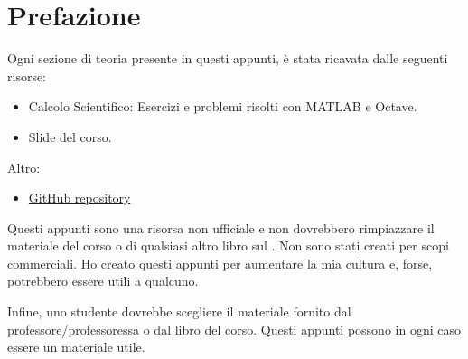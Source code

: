 \section*{Prefazione}

Ogni sezione di teoria presente in questi appunti, è stata ricavata dalle seguenti risorse:
\begin{itemize}
    \item Calcolo Scientifico: Esercizi e problemi risolti con MATLAB e Octave.\cite{quarteroni2017calcolo}
    \item Slide del corso.\cite{slides}
\end{itemize}
Altro:
\begin{itemize}
    \item[\faIcon{github}] \href{https://github.com/PoliMI-HPC-E-notes-projects-AndreVale69/HPC-E-PoliMI-university-notes}{GitHub repository}
\end{itemize}

Questi appunti sono una risorsa non ufficiale e non dovrebbero rimpiazzare il materiale del corso o di qualsiasi altro libro sul . Non sono stati creati per scopi commerciali. Ho creato questi appunti per aumentare la mia cultura e, forse, potrebbero essere utili a qualcuno.

Infine, uno studente dovrebbe scegliere il materiale fornito dal professore/professoressa o dal libro del corso. Questi appunti possono in ogni caso essere un materiale utile.